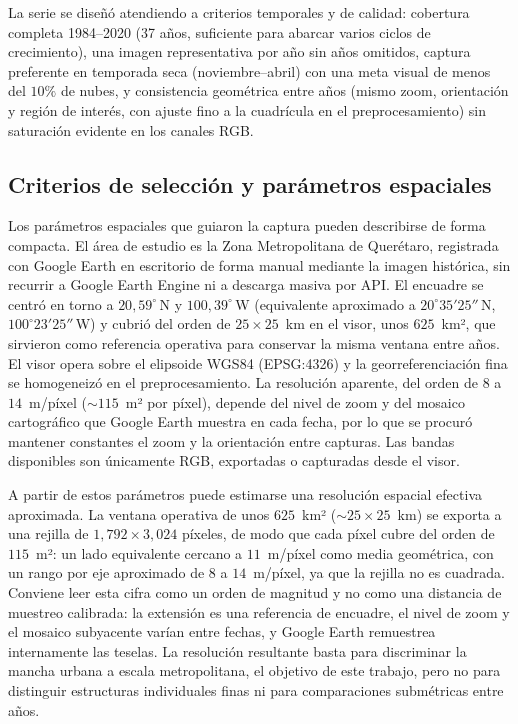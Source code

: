 La serie se diseñó atendiendo a criterios temporales y de calidad: cobertura completa 1984--2020 (37 años, suficiente para abarcar varios ciclos de crecimiento), una imagen representativa por año sin años omitidos, captura preferente en temporada seca (noviembre--abril) con una meta visual de menos del $10\%$ de nubes, y consistencia geométrica entre años (mismo zoom, orientación y región de interés, con ajuste fino a la cuadrícula en el preprocesamiento) sin saturación evidente en los canales RGB.

\subsection{Criterios de selección y parámetros espaciales}

Los parámetros espaciales que guiaron la captura pueden describirse de forma compacta. El área de estudio es la Zona Metropolitana de Querétaro, registrada con Google Earth en escritorio de forma manual mediante la imagen histórica, sin recurrir a Google Earth Engine ni a descarga masiva por API. El encuadre se centró en torno a $20{,}59^\circ$\,N y $100{,}39^\circ$\,W (equivalente aproximado a $20^\circ 35' 25''$\,N, $100^\circ 23' 25''$\,W) y cubrió del orden de $25 \times 25$~km en el visor, unos $625$~km², que sirvieron como referencia operativa para conservar la misma ventana entre años. El visor opera sobre el elipsoide WGS84 (EPSG:4326) y la georreferenciación fina se homogeneizó en el preprocesamiento. La resolución aparente, del orden de $8$ a $14$~m/píxel ($\sim 115$~m² por píxel), depende del nivel de zoom y del mosaico cartográfico que Google Earth muestra en cada fecha, por lo que se procuró mantener constantes el zoom y la orientación entre capturas. Las bandas disponibles son únicamente RGB, exportadas o capturadas desde el visor.

A partir de estos parámetros puede estimarse una resolución espacial efectiva aproximada. La ventana operativa de unos $625$~km² ($\sim 25 \times 25$~km) se exporta a una rejilla de $1{,}792 \times 3{,}024$ píxeles, de modo que cada píxel cubre del orden de $115$~m²: un lado equivalente cercano a $11$~m/píxel como media geométrica, con un rango por eje aproximado de $8$ a $14$~m/píxel, ya que la rejilla no es cuadrada. Conviene leer esta cifra como un orden de magnitud y no como una distancia de muestreo calibrada: la extensión es una referencia de encuadre, el nivel de zoom y el mosaico subyacente varían entre fechas, y Google Earth remuestrea internamente las teselas. La resolución resultante basta para discriminar la mancha urbana a escala metropolitana, el objetivo de este trabajo, pero no para distinguir estructuras individuales finas ni para comparaciones submétricas entre años.

